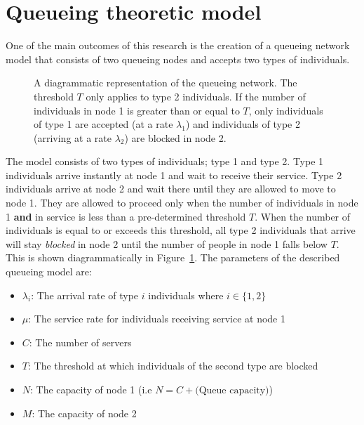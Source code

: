 \section{Queueing theoretic model}\label{sec:queueing-section}

One of the main outcomes of this research is the creation of a queueing network
model that consists of two queueing nodes and accepts two types of individuals.

\begin{figure}[H]
    \centering
    
    \caption{A diagrammatic representation of the queueing network.
    The threshold \(T\) only applies to type 2 individuals.
    If the number of individuals in node 1 is greater than or equal to
    \(T\), only individuals of type 1 are accepted (at a rate \(\lambda_1\))
    and individuals of type 2 (arriving at a rate \(\lambda_2\)) are blocked in
    node 2.}
    \label{fig:diagram_of_queueing_system}
\end{figure}

The model consists of two types of individuals; type 1 and type 2.
Type 1 individuals arrive instantly at node 1 and wait to receive their
service.
Type 2 individuals arrive at node 2 and wait there until they are
allowed to move to node 1.
They are allowed to proceed only when the number of
individuals in node 1 \textbf{and} in service is less than a
pre-determined threshold \(T\).
When the number of individuals is equal to or exceeds this threshold, all
type 2 individuals that arrive will stay \textit{blocked} in node 2
until the number of people in node 1 falls below \(T\).
This is shown diagrammatically in Figure~\ref{fig:diagram_of_queueing_system}.
The parameters of the described queueing model are:

\begin{itemize}
    \item \(\lambda_i\): The arrival rate of type \(i\) individuals where
    \(i\in\{1, 2\}\)
    \item \(\mu\): The service rate for individuals receiving service at
    node 1
    \item \(C\): The number of servers
    \item \(T\): The threshold at which individuals of the second type are
    blocked
    \item \(N\): The capacity of node 1 (i.e \(N=C + 
    \text{(Queue capacity)}\))
    \item \(M\): The capacity of node 2
\end{itemize}

